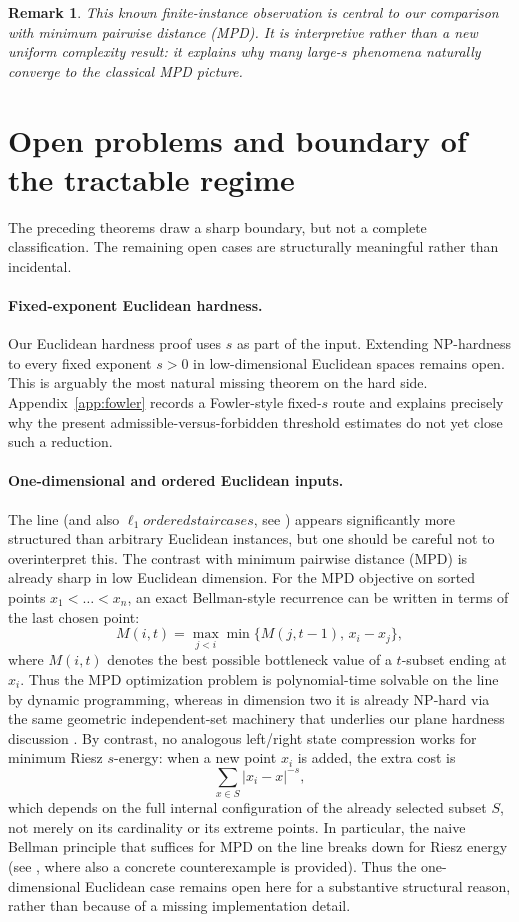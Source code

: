 \documentclass[11pt]{article}
\newtheorem{remark}{Remark}
\begin{document}
\begin{remark}
This known finite-instance observation is central to our comparison with minimum pairwise distance (MPD). It is interpretive rather than a new uniform complexity result: it explains why many large-$s$ phenomena naturally converge to the classical MPD picture.
\end{remark}

\section{Open problems and boundary of the tractable regime}

The preceding theorems draw a sharp boundary, but not a complete classification. The remaining open cases are structurally meaningful rather than incidental.

\paragraph{Fixed-exponent Euclidean hardness.}
Our Euclidean hardness proof uses $s$ as part of the input. Extending NP-hardness to every fixed exponent $s>0$ in low-dimensional Euclidean spaces remains open. This is arguably the most natural missing theorem on the hard side. Appendix~\ref{app:fowler} records a Fowler-style fixed-$s$ route and explains precisely why the present admissible-versus-forbidden threshold estimates do not yet close such a reduction.

\paragraph{One-dimensional and ordered Euclidean inputs.}
The line (and also $\ell_1 ordered staircases$, see \cite{Emmerich2026staircases}) appears significantly more structured than arbitrary Euclidean instances, but one should be careful not to overinterpret this. The contrast with minimum pairwise distance (MPD) is already sharp in low Euclidean dimension. For the MPD objective on sorted points $x_1<\dots<x_n$, an exact Bellman-style recurrence can be written in terms of the last chosen point:
\[
M(i,t)=\max_{j<i}\min\{M(j,t-1),\,x_i-x_j\},
\]
where $M(i,t)$ denotes the best possible bottleneck value of a $t$-subset ending at $x_i$. Thus the MPD optimization problem is polynomial-time solvable on the line by dynamic programming, whereas in dimension two it is already NP-hard via the same geometric independent-set machinery that underlies our plane hardness discussion \cite{agarwal2006computing}. By contrast, no analogous left/right state compression works for minimum Riesz $s$-energy: when a new point $x_i$ is added, the extra cost is
\[
\sum_{x\in S}|x_i-x|^{-s},
\]
which depends on the full internal configuration of the already selected subset $S$, not merely on its cardinality or its extreme points. In particular, the naive Bellman principle that suffices for MPD on the line breaks down for Riesz energy (see \cite{Emmerich2025}, where also a concrete counterexample is provided). Thus the one-dimensional Euclidean case remains open here for a substantive structural reason, rather than because of a missing implementation detail. 
\end{document}
